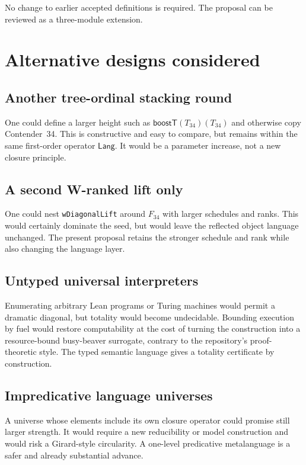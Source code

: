 \documentclass[11pt]{article}
\theoremstyle{definition}
\newcommand{\Lang}{\mathsf{Lang}}
\newcommand{\code}[1]{\texttt{#1}}
\begin{document}
No change to earlier accepted definitions is required.  The proposal can be
reviewed as a three-module extension.

\section{Alternative designs considered}

\subsection{Another tree-ordinal stacking round}

One could define a larger height such as
\(\mathsf{boostT}(T_{34})(T_{34})\) and otherwise copy Contender~34.  This is
constructive and easy to compare, but remains within the same first-order
operator \(\Lang\).  It would be a parameter increase, not a new closure
principle.

\subsection{A second W-ranked lift only}

One could nest \code{wDiagonalLift} around \(F_{34}\) with larger schedules and
ranks.  This would certainly dominate the seed, but would leave the reflected
object language unchanged.  The present proposal retains the stronger schedule
and rank while also changing the language layer.

\subsection{Untyped universal interpreters}

Enumerating arbitrary Lean programs or Turing machines would permit a dramatic
diagonal, but totality would become undecidable.  Bounding execution by fuel
would restore computability at the cost of turning the construction into a
resource-bound busy-beaver surrogate, contrary to the repository's proof-
theoretic style.  The typed semantic language gives a totality certificate by
construction.

\subsection{Impredicative language universes}

A universe whose elements include its own closure operator could promise still
larger strength.  It would require a new reducibility or model construction and
would risk a Girard-style circularity.  A one-level predicative metalanguage is
a safer and already substantial advance.
\end{document}
